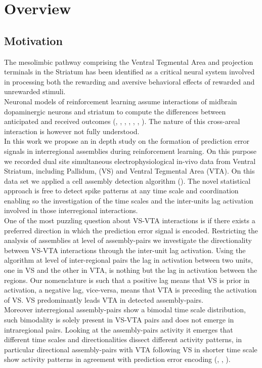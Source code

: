 \chapter{Overview}
\label{chap:Overview}
\section{Motivation}
\label{sec:Motivation}
The mesolimbic pathway comprising the Ventral Tegmental Area and projection terminals in the Striatum has been identified as a critical neural system involved in processing both the rewarding and aversive behavioral effects of rewarded and unrewarded stimuli.\\Neuronal models of reinforcement learning assume interactions of midbrain dopaminergic neurons and striatum to compute the differences between anticipated and received outcomes (\cite{Schultz2001}, \cite{Schultz2002}, \cite{Fiorillo}, \cite{Eshel1}, \cite{Pagnoni}, \cite{Radua}, \cite{Takahashi2016}). The nature of this cross-areal interaction is however not fully understood.\\In this work we propose an in depth study on the formation of prediction error signals in interregional assemblies during reinforcement learning. On this purpose we recorded dual site simultaneous electrophysiological in-vivo data from Ventral Striatum, including Pallidum, (VS) and Ventral Tegmental Area (VTA). On this data set we applied a cell assembly detection algorithm (\cite{RussoDurstewitz}).
The novel statistical approach is free to detect spike patterns at any time scale and coordination enabling so the investigation of the time scales and the inter-units lag activation involved in those interregional interactions.\\One of the most puzzling question about VS-VTA interactions is if there exists a preferred direction in which the prediction error signal is encoded. Restricting the analysis of assemblies at level of assembly-pairs we investigate the directionality between VS-VTA interactions through the inter-unit lag activation. Using the algorithm at level of inter-regional pairs the lag in activation between two units, one in VS and the other in VTA, is nothing but the lag in activation between the regions. Our nomenclature is such that a positive lag means that VS is prior in activation, a negative lag, vice-versa, means that VTA is preceding the activation of VS. VS predominantly leads VTA in detected assembly-pairs.\\Moreover interregional assembly-pairs show a bimodal time scale distribution, such bimodality is solely present in VS-VTA pairs and does not emerge in intraregional pairs. Looking at the assembly-pairs activity it emerges that different time scales and directionalities dissect different activity patterns, in particular directional assembly-pairs with VTA following VS in shorter time scale show activity patterns in agreement with prediction error encoding (\cite{Tobler2003}, \cite{Nomoto2010}, \cite{Schultz2016}).\\
